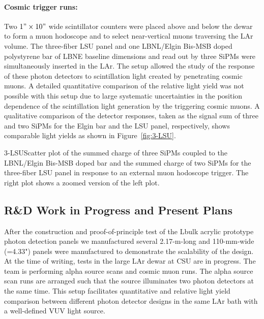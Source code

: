 \paragraph{Cosmic trigger runs:} Two $ 1" \times 10"$ wide scintillator counters were placed above and below the dewar to form a muon hodoscope and to select near-vertical muons traversing the LAr volume. The three-fiber LSU panel and one LBNL/Elgin Bis-MSB doped polystyrene bar of LBNE baseline dimensions and read out by three SiPMs were simultaneously inserted in the LAr. The setup allowed the study of the response of these photon detectors to scintillation light created by penetrating cosmic muons. A detailed quantitative comparison of the relative light yield was not possible with this setup due to large systematic uncertainties in the position dependence of the scintillation light generation by the triggering cosmic muons. A qualitative comparison of the detector responses, taken as the signal sum of three and two SiPMs for the Elgin bar and the LSU panel, respectively, shows comparable light yields as shown in Figure~\ref{fig:3-LSU}. 
        
%
%
\begin{cdrfigure}{3-LSU}{Scatter plot of the summed charge of three SiPMs coupled to the
 LBNL/Elgin Bis-MSB doped bar and the summed charge of two SiPMs for
 the three-fiber LSU panel in response to an external muon hodoscope
 trigger. The right plot shows a zoomed version of the left plot.}
\end{cdrfigure}

\subsection{R\&D Work in Progress and Present Plans }

After the construction and proof-of-principle test of the Lbulk
acrylic prototype photon detection panels we manufactured several
2.17-m-long and 110-mm-wide (=4.33") panels were manufactured to
demonstrate the scalability of the design.  At the time of writing,
tests in the large LAr dewar at CSU are in progress.  The team is
performing alpha source scans and cosmic muon runs.  The alpha source
scan runs are arranged such that the source illuminates two photon
detectors at the same time.  This setup facilitates quantitative and
relative light yield comparison between different photon detector
designs in the same LAr bath with a well-defined VUV light source.

